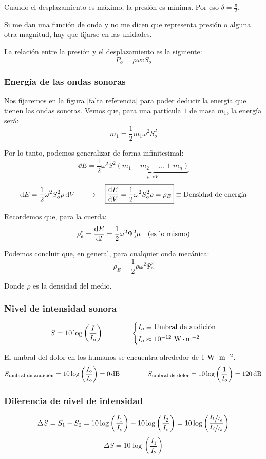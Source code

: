 \documentclass[a4paper]{book}
\begin{document}
Cuando el desplazamiento es máximo, la presión es mínima. Por eso $\delta = \frac{\pi}{2}$.

Si me dan una función de onda y no me dicen que representa presión o alguna otra magnitud, hay que fijarse en las unidades.

La relación entre la presión y el desplazamiento es la siguiente:
\[P_o = \rho\omega v S_o\]

\subsubsection{Energía de las ondas sonoras}
Nos fijaremos en la figura [falta referencia] para poder deducir la energía que tienen las ondas sonoras. Vemos que, para una partícula $1$ de masa $m_1$, la energía será:
\[m_1 = \frac{1}{2}m_1\omega^2S_o^2\]

Por lo tanto, podemos generalizar de forma infinitesimal:
\[\dd{E} = \frac{1}{2}\omega^2S^2\underbrace{\left( m_1 + m_2 + \ldots + m_n \right)}_{\rho \cdot \dd{V}}\]
\[\dd{E} = \frac{1}{2}\omega^2 S_o^2\rho\dd{V}\quad \longrightarrow \quad \boxed{\dv{E}{V} = \frac{1}{2}\omega^2S_o^2\rho = \rho_E} \equiv \text{Densidad de energía}\]

Recordemos que, para la cuerda:
\[\rho_e^* = \dv{E}{l} = \frac{1}{2}\omega^2\Psi_o^2\mu \quad \text{(es lo mismo)}\]

Podemos concluir que, en general, para cualquier onda mecánica:
\[\boxed{\rho_E = \frac{1}{2}\rho\omega^2\Psi_o^2}\]

Donde $\rho$ es la densidad del medio.

\subsubsection{Nivel de intensidad sonora}
\[S = 10\log\left( \frac{I}{I_o} \right) \qquad \qquad \left\{ \begin{matrix*}[l]
		I_o \equiv \text{Umbral de audición}\\[5pt]
		I_o \approx 10^{-12}\, \W \cdot \m^{-2}
	\end{matrix*} \right. \]

El umbral del dolor en los humanos se encuentra alrededor de 1 $\operatorname{W}\cdot\operatorname{m}^{-2}$.
\[S_{\text{umbral de audición}} = 10\log\left( \frac{I_o}{I_o} \right) = 0\operatorname{dB} \qquad \qquad S_{\text{umbral de dolor}} = 10\log\left( \frac{1}{I_o}\right)= 120\operatorname{dB}\]

\subsubsection{Diferencia de nivel de intensidad}
\[\Delta S = S_1 - S_2 = 10 \log\left( \frac{I_1}{I_o} \right) - 10 \log\left( \frac{I_2}{I_o} \right) = 10 \log\left( \frac{\sfrac{I_1}{I_o}}{\sfrac{I_2}{I_o}} \right)\]
\[\boxed{\Delta S = 10 \log\left( \frac{I_1}{I_2} \right)}\]
\end{document}
